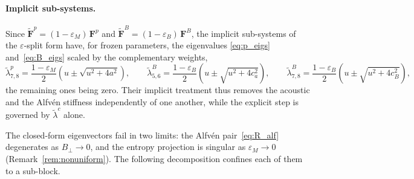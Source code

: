 \documentclass[a4paper,fleqn]{cas-sc}
\theoremstyle{remark}
\newcommand{\eps}{\varepsilon}
\newcommand{\epsM}{\eps_{M}}
\newcommand{\epsB}{\eps_{B}}
\begin{document}
\paragraph{Implicit sub-systems.}
Since $\tilde{\mathbf F}^p=(1-\epsM)\,\mathbf F^p$ and
$\tilde{\mathbf F}^B=(1-\epsB)\,\mathbf F^B$, the implicit sub-systems of the
$\varepsilon$-split form have, for frozen parameters, the eigenvalues
\eqref{eq:p_eigs} and~\eqref{eq:B_eigs} scaled by the complementary weights,
\begin{equation}
\label{eq:implicit_eigs}
\tilde\lambda^{p}_{7,8}=\frac{1-\epsM}{2}\!\left(u\pm\sqrt{u^2+4a^2}\right),
\qquad
\tilde\lambda^{B}_{5,6}=\frac{1-\epsB}{2}\!\left(u\pm\sqrt{u^2+4c_a^2}\right),
\qquad
\tilde\lambda^{B}_{7,8}=\frac{1-\epsB}{2}\!\left(u\pm\sqrt{u^2+4c_B^2}\right),
\end{equation}
the remaining ones being zero. Their implicit treatment thus removes the
acoustic and the Alfv\'en stiffness independently of one another, while the
explicit step is governed by $\tilde\lambda^{c}$ alone.

The closed-form eigenvectors fail in two limits: the Alfv\'en
pair~\eqref{eq:R_alf} degenerates as $B_\perp\to0$, and the entropy
projection is singular as $\epsM\to0$ (Remark~\ref{rem:nonuniform}). The
following decomposition confines each of them to a sub-block.
\end{document}
